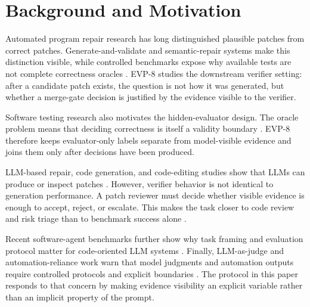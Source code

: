 \documentclass[conference]{IEEEtran}
\begin{document}
\section{Background and Motivation}

Automated program repair research has long distinguished plausible patches from correct patches. Generate-and-validate and semantic-repair systems make this distinction visible, while controlled benchmarks expose why available tests are not complete correctness oracles \cite{qi_issta_2015_patch_plausibility,long_popl_2016_prophet,long_fse_2015_spr,nguyen_icse_2013_semfix,smith_fse_2015_overfitting,just_issta_2014_defects4j,widyasari_fse_2020_bugsinpy,durieux_saner_2019_bears,lin_splash_2017_quixbugs}. EVP-8 studies the downstream verifier setting: after a candidate patch exists, the question is not how it was generated, but whether a merge-gate decision is justified by the evidence visible to the verifier.

Software testing research also motivates the hidden-evaluator design. The oracle problem means that deciding correctness is itself a validity boundary \cite{barr_tse_2015_oracle_problem}. EVP-8 therefore keeps evaluator-only labels separate from model-visible evidence and joins them only after decisions have been produced.

LLM-based repair, code generation, and code-editing studies show that LLMs can produce or inspect patches \cite{xia_zhang_icse_2023_llm_apr,tufano_icse_2019_bugfix_nmt,chen_arxiv_2021_codex,joshi_arxiv_2022_repair_is_nearly_generation}. However, verifier behavior is not identical to generation performance. A patch reviewer must decide whether visible evidence is enough to accept, reject, or escalate. This makes the task closer to code review and risk triage than to benchmark success alone \cite{bacchelli_bird_icse_2013_code_review,li_fse_2022_codereviewer}.

Recent software-agent benchmarks further show why task framing and evaluation protocol matter for code-oriented LLM systems \cite{jimenez_iclr_2024_swebench,yang_neurips_2024_sweagent}. Finally, LLM-as-judge and automation-reliance work warn that model judgments and automation outputs require controlled protocols and explicit boundaries \cite{zheng_neurips_2023_llm_judge,wang_acl_2024_not_fair_evaluators,parasuraman_riley_1997_automation}. The protocol in this paper responds to that concern by making evidence visibility an explicit variable rather than an implicit property of the prompt.
\end{document}
